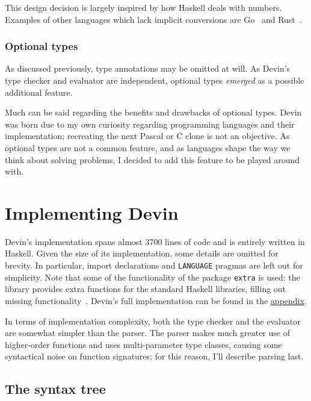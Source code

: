 \documentclass[UdineBachThesis,american,11pt]{PhdThesis}
\begin{document}
  This design decision is largely inspired by how Haskell deals with numbers.
  Examples of other languages which lack implicit conversions are
  Go~\cite{go-numeric-types} and Rust~\cite{rust-conversion}.

  \subsection{Optional types}

  As discussed previously, type annotations may be omitted at will. As Devin's
  type checker and evaluator are independent, optional types \emph{emerged} as a
  possible additional feature.

  Much can be said regarding the benefits and drawbacks of optional types. Devin
  was born due to my own curiosity regarding programming languages and their
  implementation; recreating the next Pascal or C clone is not an objective. As
  optional types are not a common feature, and as languages shape the way we
  think about solving problems, I decided to add this feature to be played
  around with.

  \newpage
  \thispagestyle{empty}

  \chapter{Implementing Devin}

  Devin's implementation spans almost 3700 lines of code and is entirely written
  in Haskell. Given the size of its implementation, some details are omitted for
  brevity. In particular, import declarations and \mbox{\texttt{LANGUAGE}}
  pragmas are left out for simplicity. Note that some of the functionality of
  the package \mbox{\texttt{extra}} is used: the library provides extra
  functions for the standard Haskell libraries, filling out missing
  functionality~\cite{extra}. Devin's full implementation can be found in the
  \hyperref[chapter:devin-source-code]{appendix}.

  In terms of implementation complexity, both the type checker and the evaluator
  are somewhat simpler than the parser. The parser makes much greater use of
  higher-order functions and uses multi-parameter type classes, causing some
  syntactical noise on function signatures; for this reason, I'll describe
  parsing last.

  \section{The syntax tree}
\end{document}

